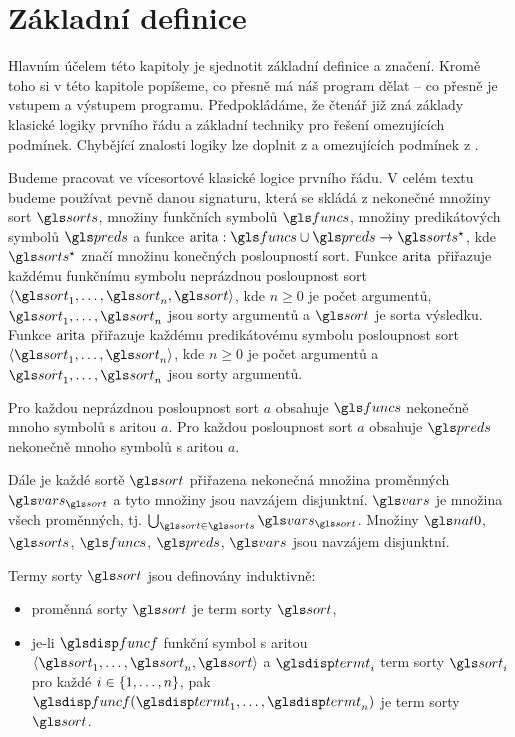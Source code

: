 \chapter{Základní definice}

Hlavním účelem této kapitoly je sjednotit základní definice a značení.
Kromě toho si v této kapitole popíšeme,
co přesně má náš program dělat -- co přesně je vstupem a výstupem programu.
Předpokládáme, že čtenář již zná základy klasické logiky prvního
řádu a základní techniky pro řešení omezujících podmínek.
Chybějící znalosti logiky lze doplnit z
\cite{enderton2001logic} a omezujících podmínek z
\cite{dechter2003constraints}.

Budeme pracovat ve vícesortové klasické logice prvního řádu.
V celém textu budeme
používat pevně danou signaturu, která se skládá z nekonečné množiny sort
$\sorts$, množiny funkčních symbolů $\funcs$, množiny predikátových symbolů
$\preds$ a funkce $\arity: \funcs \cup \preds \to \sorts^\star$,
kde $\sorts^\star$ značí množinu konečných posloupností sort.
Funkce $\operatorname{arita}$ přiřazuje každému funkčnímu symbolu neprázdnou posloupnost
sort $\langle \sort_1 \comdots \sort_n, \sort \rangle$,
kde $n \ge 0$ je počet argumentů,
$\sort_1 \comdots \sort_n$ jsou sorty argumentů a $\sort$ je sorta výsledku.
Funkce $\operatorname{arita}$ přiřazuje každému predikátovému symbolu posloupnost
sort $\langle \sort_1 \comdots \sort_n \rangle$, kde $n \ge 0$
je počet argumentů a $\sort_1 \comdots \sort_n$ jsou sorty argumentů.

Pro každou neprázdnou posloupnost sort $a$ obsahuje $\funcs$ nekonečně
mnoho symbolů s aritou $a$. Pro každou posloupnost sort $a$ obsahuje
$\preds$ nekonečně mnoho symbolů s aritou $a$.

Dále je každé sortě $\sort$ přiřazena nekonečná množina proměnných
$\vars_\sort$ a tyto množiny jsou navzájem disjunktní.
$\vars$ je množina všech proměnných,
tj. $\bigcup_{\sort \in \sorts} \vars_\sort$. Množiny $\nat0$, $\sorts$, $\funcs$,
$\preds$, $\vars$ jsou navzájem disjunktní.

Termy sorty $\sort$ jsou definovány induktivně:

\begin{itemize}
\item proměnná sorty $\sort$ je term sorty $\sort$,
\item je-li $\func$ funkční symbol s aritou
  $\langle \sort_1 \comdots \sort_n, \sort \rangle$
  a $\term_i$ term sorty $\sort_i$ pro každé $i \in \{ 1 , \ldots, n \}$, pak
  $\func(\term_1 \comdots \term_n)$ je term sorty $\sort$.
\end{itemize}

